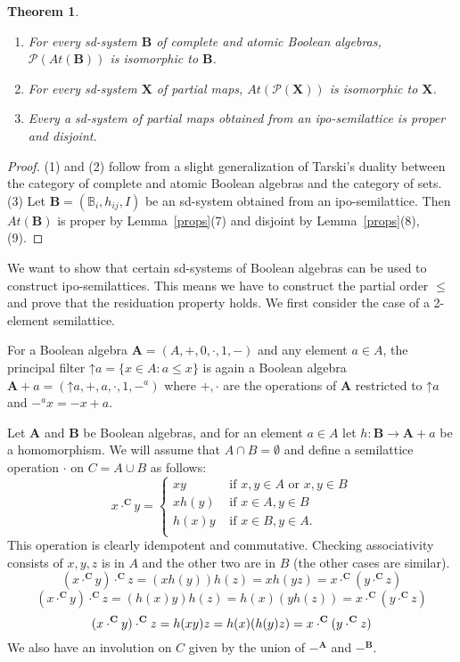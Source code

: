 \documentclass[12pt]{amsart}
\newtheorem{theorem}{Theorem}%
\newcommand{\m}{\mathbf} %
\newcommand{\ua}{\mathord{\uparrow}}
\begin{document}
\begin{theorem}\begin{enumerate}
\item For every sd-system $\m B$ of complete and atomic Boolean algebras, $\mathcal P(At(\m B))$ is isomorphic to $\m B$.
\item For every sd-system $\m X$ of partial maps, $At(\mathcal P(\m X))$ is isomorphic to $\m X$.
\item
Every a sd-system of partial maps obtained from an ipo-semilattice is proper and
disjoint.
\end{enumerate}
\end{theorem}
\begin{proof}
(1) and (2) follow from a slight generalization of Tarski's duality between the category of complete and atomic Boolean algebras and the category of sets.
(3) Let $\m B=(\mathbb B_i,h_{ij},I)$ be an sd-system obtained from an ipo-semilattice. Then $At(\m B)$ is proper by Lemma~\ref{props}(7) and disjoint by Lemma~\ref{props}(8), (9).
\end{proof}

We want to show that certain sd-systems of Boolean algebras can be used to construct ipo-semilattices. This means we have to construct the partial order $\le$ and prove that the residuation property holds. We first consider the case of a 2-element semilattice.

For a Boolean algebra $\m A=(A,+,0,\cdot,1,-)$ and any element $a\in A$, the principal filter $\ua a=\{x\in A: a\le x\}$ is again a Boolean algebra $\m A{+}a=(\ua a,+,a,\cdot,1,-^a)$ where $+,\cdot$ are the operations of $\m A$ restricted to $\ua a$ and $-^a x=-x+a$.

Let $\m A$ and $\m B$ be Boolean algebras, and for an element $a\in A$ let $h:\m B\to\m A{+}a$ be a homomorphism. We will assume that $A\cap B=\emptyset$ and define a semilattice operation $\cdot$ on $C=A\cup B$ as follows:
$$
x\cdot^\m Cy=\begin{cases}
xy &\text{ if $x,y\in A$ or $x,y\in B$}\\
xh(y) &\text{ if $x\in A,y\in B$}\\
h(x)y &\text{ if $x\in B,y\in A$}.\\
\end{cases}
$$
This operation is clearly idempotent and commutative. Checking associativity consists of  $x,y,z$ is in $A$ and the other two are in $B$ (the other cases are similar).
\[
(x\cdot^\m Cy)\cdot^\m Cz=(xh(y))h(z)=xh(yz)=x\cdot^\m C(y\cdot^\m Cz)
\]\[
(x\cdot^\m Cy)\cdot^\m Cz=(h(x)y)h(z)=h(x)(yh(z))=x\cdot^\m C(y\cdot^\m Cz)
\]\[
(x\cdot^\m Cy)\cdot^\m Cz=h(xy)z=h(x)(h(y)z)=x\cdot^\m C(y\cdot^\m Cz)\\
\]
We also have an involution on $C$ given by the union of $-^\m A$ and $-^\m B$.
\end{document}
